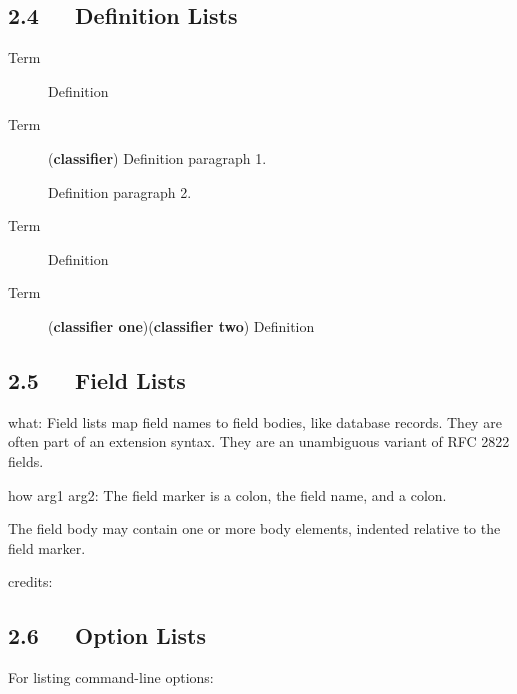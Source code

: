 \documentclass[a4paper]{article}
\begin{document}
\subsection{2.4   Definition Lists%
  \label{definition-lists}%
}

\begin{description}
\item[{Term}] 
Definition

\item[{Term}] (\textbf{classifier})
Definition paragraph 1.

Definition paragraph 2.

\item[{Term}] 
Definition

\item[{Term}] (\textbf{classifier one})(\textbf{classifier two})
Definition

\end{description}


\subsection{2.5   Field Lists%
  \label{field-lists}%
}

\begin{DUfieldlist}
\item[{what:}]
Field lists map field names to field bodies, like database
records.  They are often part of an extension syntax.  They are
an unambiguous variant of RFC 2822 fields.

\item[{how arg1 arg2:}]
The field marker is a colon, the field name, and a colon.

The field body may contain one or more body elements, indented
relative to the field marker.

\item[{credits:}]
\end{DUfieldlist}


\subsection{2.6   Option Lists%
  \label{option-lists}%
}

For listing command-line options:
\end{document}
